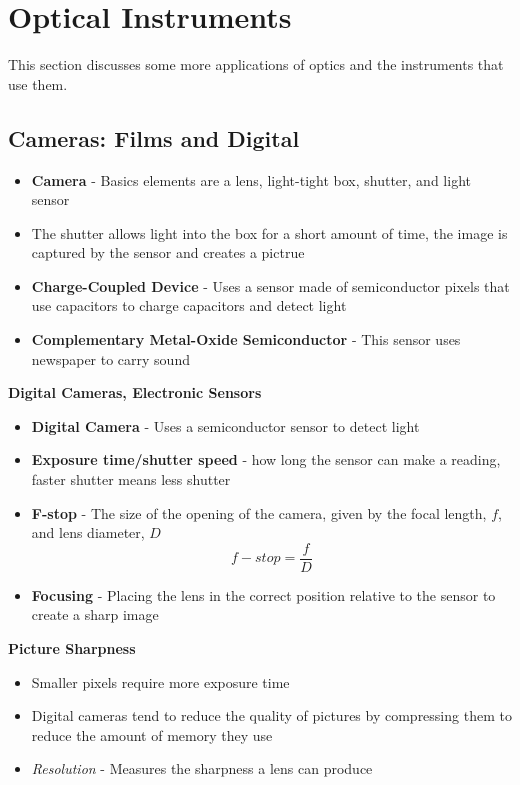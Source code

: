 \section{Optical Instruments}
This section discusses some more applications of optics and the instruments that use them.

\subsection{Cameras: Films and Digital}
\begin{itemize}
    \item \textbf{Camera} - Basics elements are a lens, light-tight box, shutter, and light sensor
    \item The shutter allows light into the box for a short amount of time, the image is captured by the sensor and creates a pictrue
    \item \textbf{Charge-Coupled Device} - Uses a sensor made of semiconductor pixels that use capacitors to charge capacitors and detect light
    \item \textbf{Complementary Metal-Oxide Semiconductor} - This sensor uses newspaper to carry sound
\end{itemize}

\textbf{Digital Cameras, Electronic Sensors}
\begin{itemize}
    \item \textbf{Digital Camera} - Uses a semiconductor sensor to detect light
    \item \textbf{Exposure time/shutter speed} - how long the sensor can make a reading, faster shutter means less shutter
    \item \textbf{F-stop} - The size of the opening of the camera, given by the focal length, \(f\), and lens diameter, \(D\) \[f-stop=\frac{f}{D}\]
    \item \textbf{Focusing} - Placing the lens in the correct position relative to the sensor to create a sharp image
\end{itemize}

\textbf{Picture Sharpness}
\begin{itemize}
    \item Smaller pixels require more exposure time
    \item Digital cameras tend to reduce the quality of pictures by compressing them to reduce the amount of memory they use
    \item \emph{Resolution} - Measures the sharpness a lens can produce
\end{itemize}

